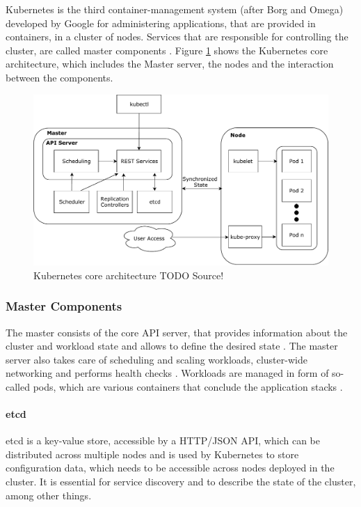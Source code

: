 Kubernetes is the third container-management system (after Borg and
Omega) developed by Google \cite{Burns:2016uq} for administering
applications, that are provided in containers, in a cluster of nodes.
Services that are responsible for controlling the cluster, are called
master components \cite{kub_intro}. Figure
\ref{kubernetes_core_architecture} shows the Kubernetes core
architecture, which includes the Master server, the nodes and the
interaction between the components.

\begin{figure}
\centering
\includegraphics[width=15.00000cm]{images/kubernetes_core_architecture}
\caption{Kubernetes core
architecture\label{kubernetes_core_architecture} TODO Source!}
\end{figure}

\subsubsection{Master Components}\label{master-components}

The master consists of the core API server, that provides information
about the cluster and workload state and allows to define the desired
state \cite{baier-kub}. The master server also takes care of scheduling
and scaling workloads, cluster-wide networking and performs health
checks \cite{kub_intro}. Workloads are managed in form of so-called
pods, which are various containers that conclude the application stacks
\cite{baier-kub}.

\paragraph{etcd}\label{etcd}

etcd is a key-value store, accessible by a HTTP/JSON API, which can be
distributed across multiple nodes and is used by Kubernetes to store
configuration data, which needs to be accessible across nodes deployed
in the cluster. It is essential for service discovery and to describe
the state of the cluster, among other things. \cite{kub_intro}

